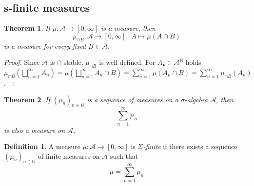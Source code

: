 \documentclass[11pt, a4paper, openany]{book}
\newtheorem{thm}{Theorem}\newtheorem{lem}{Lemma}\newtheorem{crl}{Corollary}
\theoremstyle{definition}
\newtheorem{define}{Definition}\newtheorem{exam}{Example}\newtheorem{remark}{Remark}
\begin{document}
\subsection{s-finite measures}
    \begin{thm}\label{mu(A cap ) is a measure}
        If $\mu:\mathscr{A}\rightarrow [0,\infty]$ is a measure, then 
        \[
            \mu_{\cap B}:\mathscr{A}\rightarrow [0,\infty],\,\,A\mapsto \mu(A\cap B)
        \]
        is a measure for every fixed $B\in\mathscr{A}$.
    \end{thm}
    \begin{proof}
        Since $\mathscr{A}$ is $\cap$-stable, $\mu_{\cap B}$ is well-defined.
        For $A_\bullet\in\mathscr{A}^\mathbb{N}$ holds $\mu_{\cap B}(\bigsqcup_{n=1}^\infty A_n)=\mu(\bigsqcup_{n=1}^\infty A_n\cap B)=\sum_{n=1}^\infty\mu(A_n\cap B)=\sum_{n=1}^\infty\mu_{\cap B}(A_n)$.
    \end{proof}
    \begin{thm}
        If $(\mu_n)_{n\in\mathbb{N}}$ is a sequence of measures on a $\sigma$-algebra $\mathscr{A}$, then
        \[
            \sum_{n=1}^\infty \mu_n
        \]
        is also a measure on $\mathscr{A}$.
    \end{thm}
    \begin{define}
        A measure $\mu:\mathscr{A}\rightarrow [0,\infty]$ is \textit{$\Sigma$-finite} if there exists a sequence $(\mu_n)_{n\in\mathbb{N}}$ of finite measures on $\mathscr{A}$ such that
        \[
            \mu=\sum_{n=1}^\infty \mu_n
        \]
    \end{define}
\end{document}
